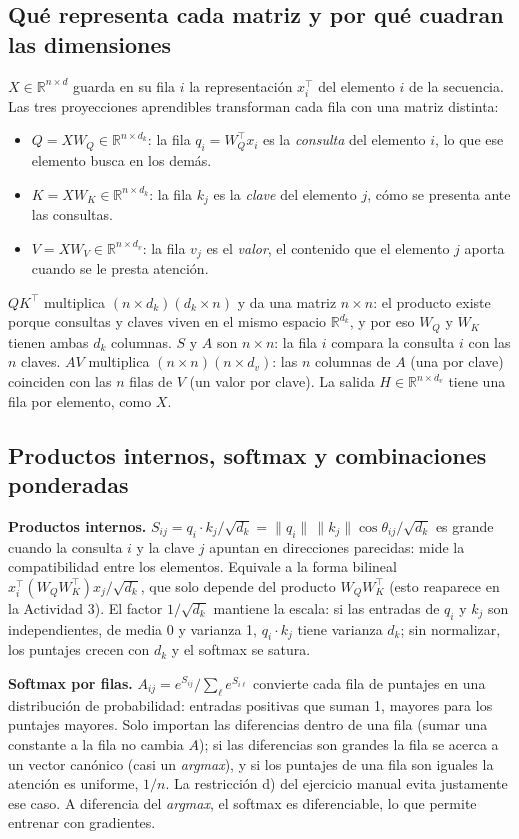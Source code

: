 \documentclass[10pt]{article}
\newcommand{\R}{\mathbb{R}}
\begin{document}
\subsection{Qué representa cada matriz y por qué cuadran las dimensiones}
$X\in\R^{n\times d}$ guarda en su fila $i$ la representación $x_i^\top$ del elemento $i$ de la
secuencia. Las tres proyecciones aprendibles transforman cada fila con una matriz distinta:
\begin{itemize}[nosep]
  \item $Q = XW_Q\in\R^{n\times d_k}$: la fila $q_i = W_Q^\top x_i$ es la \emph{consulta} del
        elemento $i$, lo que ese elemento busca en los demás.
  \item $K = XW_K\in\R^{n\times d_k}$: la fila $k_j$ es la \emph{clave} del elemento $j$, cómo se
        presenta ante las consultas.
  \item $V = XW_V\in\R^{n\times d_v}$: la fila $v_j$ es el \emph{valor}, el contenido que el
        elemento $j$ aporta cuando se le presta atención.
\end{itemize}
$QK^\top$ multiplica $(n\times d_k)(d_k\times n)$ y da una matriz $n\times n$: el producto existe
porque consultas y claves viven en el mismo espacio $\R^{d_k}$, y por eso $W_Q$ y $W_K$ tienen ambas
$d_k$ columnas. $S$ y $A$ son $n\times n$: la fila $i$ compara la consulta $i$ con las $n$ claves.
$AV$ multiplica $(n\times n)(n\times d_v)$: las $n$ columnas de $A$ (una por clave) coinciden con
las $n$ filas de $V$ (un valor por clave). La salida $H\in\R^{n\times d_v}$ tiene una fila por
elemento, como $X$.

\subsection{Productos internos, softmax y combinaciones ponderadas}\label{sec:productos}
\textbf{Productos internos.} $S_{ij} = q_i\cdot k_j/\sqrt{d_k}
= \|q_i\|\,\|k_j\|\cos\theta_{ij}/\sqrt{d_k}$ es grande cuando la consulta $i$ y la clave $j$
apuntan en direcciones parecidas: mide la compatibilidad entre los elementos. Equivale a la forma
bilineal $x_i^\top (W_QW_K^\top) x_j/\sqrt{d_k}$, que solo depende del producto $W_QW_K^\top$ (esto
reaparece en la Actividad 3). El factor $1/\sqrt{d_k}$ mantiene la escala: si las entradas de $q_i$
y $k_j$ son independientes, de media 0 y varianza 1, $q_i\cdot k_j$ tiene varianza $d_k$; sin
normalizar, los puntajes crecen con $d_k$ y el softmax se satura.

\textbf{Softmax por filas.} $A_{ij} = e^{S_{ij}}/\sum_{\ell} e^{S_{i\ell}}$ convierte cada fila de
puntajes en una distribución de probabilidad: entradas positivas que suman 1, mayores para los
puntajes mayores. Solo importan las diferencias dentro de una fila (sumar una constante a la fila no
cambia $A$); si las diferencias son grandes la fila se acerca a un vector canónico (casi un
\emph{argmax}), y si los puntajes de una fila son iguales la atención es uniforme, $1/n$. La
restricción d) del ejercicio manual evita justamente ese caso. A diferencia del \emph{argmax}, el
softmax es diferenciable, lo que permite entrenar con gradientes.
\end{document}
